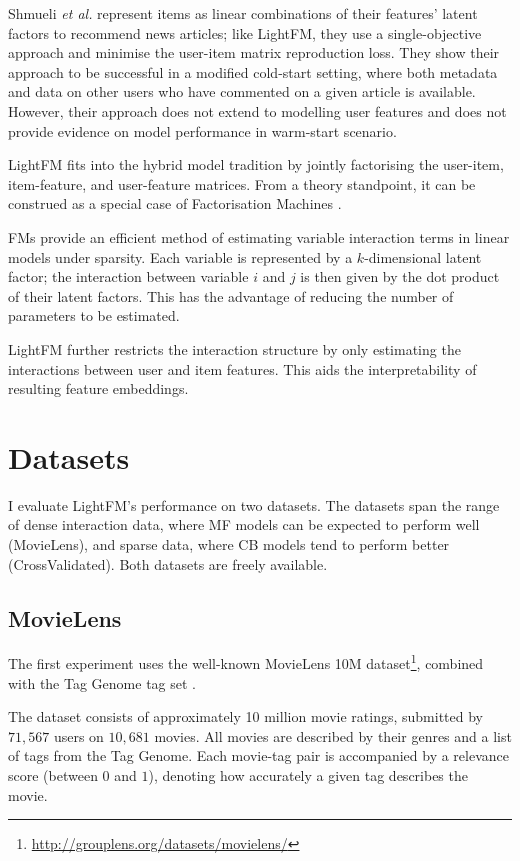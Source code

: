 \documentclass{sig-alternate}
\begin{document}
Shmueli \textit{et al.} \cite{shmueli2012care} represent items as linear combinations of their features' latent factors to recommend news articles; like LightFM, they use a single-objective approach and minimise the user-item matrix reproduction loss. They show their approach to be successful in a modified cold-start setting, where both metadata and data on other users who have commented on a given article is available. However, their approach does not extend to modelling user features and does not provide evidence on model performance in warm-start scenario.

LightFM fits into the hybrid model tradition by jointly factorising the user-item, item-feature, and user-feature matrices. From a theory standpoint, it can be construed as a special case of Factorisation Machines \cite{rendle2010factorization}.

FMs provide an efficient method of estimating variable interaction terms in linear models under sparsity. Each variable is represented by a $k$-dimensional latent factor; the interaction between variable $i$ and $j$ is then given by the dot product of their latent factors. This has the advantage of reducing the number of parameters to be estimated.

LightFM further restricts the interaction structure by only estimating the interactions between user and item features. This aids the interpretability of resulting feature embeddings.

\section{Datasets}
\label{sec:datasets}
I evaluate LightFM's performance on two datasets. The datasets span the range of dense interaction data, where MF models can be expected to perform well (MovieLens), and sparse data, where CB models tend to perform better (CrossValidated). Both datasets are freely available.

\subsection{MovieLens}
The first experiment uses the well-known MovieLens 10M dataset\footnote{\url{http://grouplens.org/datasets/movielens/}}, combined with the Tag Genome tag set \cite{movielens:genome}.

The dataset consists of approximately 10 million movie ratings, submitted by $71,567$ users on $10,681$ movies. All movies are described by their genres and a list of tags from the Tag Genome. Each movie-tag pair is accompanied by a relevance score (between $0$ and $1$), denoting how accurately a given tag describes the movie.
\end{document}
